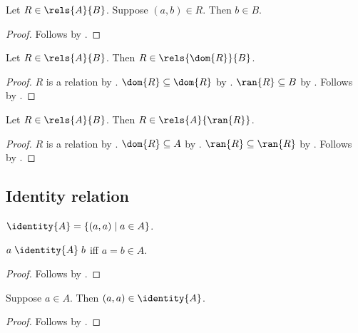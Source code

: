 \begin{proposition}\label{rels_type_ran}
    Let $R\in\rels{A}{B}$.
    Suppose $(a,b)\in R$.
    Then $b\in B$.
\end{proposition}
\begin{proof}
    Follows by .
\end{proof}

\begin{proposition}\label{rels_restrict_dom}
    Let $R\in\rels{A}{B}$.
    Then $R\in\rels{\dom{R}}{B}$.
\end{proposition}
\begin{proof}
    $R$ is a relation by .
    $\dom{R}\subseteq \dom{R}$ by .
    $\ran{R}\subseteq B$ by .
    Follows by .
\end{proof}

\begin{proposition}\label{rels_restrict_ran}
    Let $R\in\rels{A}{B}$.
    Then $R\in\rels{A}{\ran{R}}$.
\end{proposition}
\begin{proof}
    $R$ is a relation by .
    $\dom{R}\subseteq A$ by .
    $\ran{R}\subseteq \ran{R}$ by .
    Follows by .
\end{proof}

\subsection{Identity relation}

\begin{definition}\label{id}
    $\identity{A} = \{(a,a)\mid a\in A\}$.
\end{definition}

\begin{proposition}\label{id_iff}
    $a\mathrel{\identity{A}}b$ iff $a = b\in A$.
\end{proposition}
\begin{proof}
    Follows by .
\end{proof}

\begin{proposition}\label{id_elem_intro}
    Suppose $a\in A$.
    Then $(a, a) \in\identity{A}$.
\end{proposition}
\begin{proof}
    Follows by .
\end{proof}

